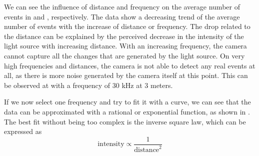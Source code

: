 We can see the influence of distance and frequency on the average number of events in  and , respectively. The data show a decreasing trend of the average number of events
with the increase of distance or frequency. The drop related to the distance can be explained by the perceived decrease in the intensity of the light source with increasing distance. With an increasing frequency, the camera cannot capture
all the changes that are generated by the light source. On very high frequencies and distances, the camera is not able
to detect any real events at all, as there is more noise generated by the camera itself at this point. This can be observed
at  with a frequency of $30$ kHz at $3$ meters.

If we now select one frequency and try to fit it with a curve,
we can see that the data can be approximated with a rational or exponential function, as shown in .
The best fit without being too complex is the inverse square law, which can be expressed as
\begin{equation}
	\text{intensity} \propto \frac{1}{\text{distance}^2}
\end{equation}

